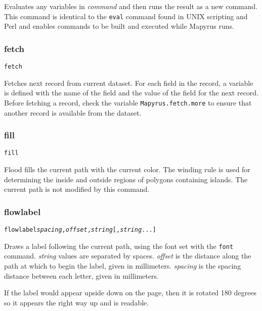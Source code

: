 Evaluates any variables in \textit{command} and then
runs the result as a new command.
This command is identical to the \texttt{eval} command found in
UNIX scripting and Perl and
enables commands to be built and executed while Mapyrus runs.

\subsubsection{fetch}

\begin{alltt}
fetch
\end{alltt}

Fetches next record from current dataset.
For each field in the record, a variable is defined with the name
of the field and the value of the field for the next record.
Before fetching a record, check the variable
\texttt{Mapyrus.fetch.more}
to ensure that another record is available from the dataset.

\subsubsection{fill}

\begin{alltt}
fill
\end{alltt}

Flood fills the current path with the current color.
The winding rule is used for determining the inside and outside
regions of polygons containing islands.
The current path is not modified by this command.

\subsubsection{flowlabel}

\begin{alltt}
flowlabel \textit{spacing}, \textit{offset}, \textit{string} [, \textit{string} ...]
\end{alltt}

Draws a label following the current path,
using the font set with the \texttt{font} command.
\textit{string} values are
separated by spaces.
\textit{offset} is the distance along the path at which to begin
the label, given in millimeters.
\textit{spacing} is the spacing distance
between each letter, given in millimeters.

If the label would appear upside down on the page, then it is rotated
180 degrees so it appears the right way up and is readable.

